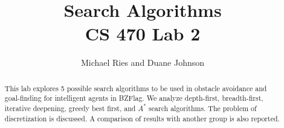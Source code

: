 \documentclass[letterpaper,12pt]{report}
\begin{document}
\title{Search Algorithms \\
{\large \textbf{CS 470 Lab 2}}}
\author{Michael Ries and Duane Johnson}
\maketitle
\begin{abstract}
This lab explores 5 possible search algorithms to be used in obstacle avoidance and
goal-finding for intelligent agents in BZFlag.  We analyze depth-first, breadth-first,
iterative deepening, greedy best first, and $A^*$ search algorithms.  The problem of
discretization is discussed.  A comparison of results with another group is also reported.
\end{abstract}
\tableofcontents



%
\appendix

%
%
%
%
\end{document}
